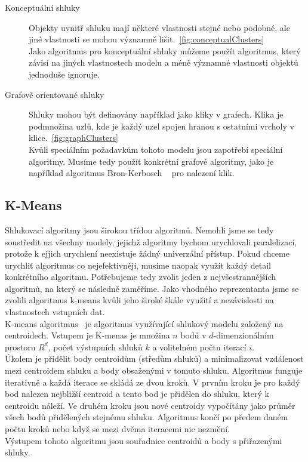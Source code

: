 \begin{description}
\item[Konceptuální shluky] Objekty uvnitř shluku mají některé vlastnosti stejné nebo podobné, ale jiné vlastnosti se mohou významně lišit.~\autoref{fig:conceptualClusters} \\
Jako algoritmus pro konceptuální shluky můžeme použít algoritmus, který závisí na jiných vlastnostech modelu a méně významné vlastnosti objektů jednoduše ignoruje.

\item[Grafově orientované shluky] Shluky mohou být definovány například jako kli\-ky v grafech. Klika je podmnožina uzlů, kde je každý uzel spojen hranou s ostatními vrcholy v klice.~\autoref{fig:graphClusters} \\
Kvůli speciálním požadavkům tohoto modelu jsou zapotřebí speciální algoritmy. Musíme tedy použít konkrétní grafové algoritmy, jako je například algoritmus Bron-Kerbosch ~\cite{Sun15} pro nalezení klik.
\end{description}

\subsection{K-Means} 
Shlukovací algoritmy jsou širokou třídou algoritmů. Nemohli jsme se tedy sou\-stře\-dit na všechny modely, jejichž algoritmy bychom urychlovali paralelizací, protože k ejjich urychlení neexistuje žádný univerzální přístup. Pokud chceme urychlit algoritmus co nejefektivněji, musíme naopak využít každý detail konkrétního algoritmu. Potřebujeme tedy zvolit jeden z nejvšestrannějších algoritmů, na který se následně zaměříme. Jako vhodného reprezentanta jsme se zvolili algoritmus k-means kvůli jeho široké škále využití a nezávislosti na vlastnostech vstupních dat. \\
K-means algoritmus~\cite{Aggarwal13, Tan05} je algoritmus využívající shlukový modelu založený na centroidech. Vstupem je K-menas je množina $n$ bodů v $d$-dimenzionálním prostoru $R^d$, počet výstupních shluků $k$ a volitelném počtu iterací $ i $. \\
Úkolem je přidělit body centroidům (středům shluků) a minimalizovat vzdálenost mezi centroidem shluku a body obsaženými v tomuto shluku. Algoritmus funguje iterativně a každá iterace se skládá ze dvou kroků. V prvním kroku je pro každý bod nalezen nejbližší centroid a tento bod je přidělen do shluku, který k centroidu náleží. Ve druhém kroku jsou nové centroidy vypočítány jako průměr všech bodů přidělených stejnému shluku. Algoritmus končí po předem daném počtu kroků nebo když se mezi dvěma iteracemi nic nezmění. \\
Výstupem tohoto algoritmu jsou souřadnice centroidů a body s přiřazenými shluky.

